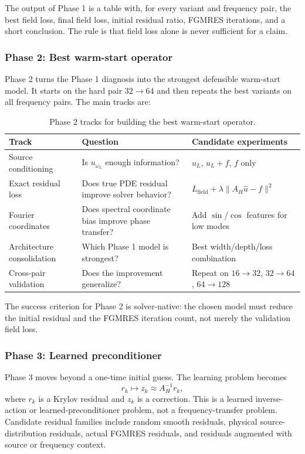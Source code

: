 The output of Phase 1 is a table with, for every variant and frequency pair,
the best field loss, final field loss, initial residual ratio, FGMRES
iterations, and a short conclusion. The rule is that field loss alone is never
sufficient for a claim.

\subsubsection{Phase 2: Best warm-start operator}

Phase 2 turns the Phase 1 diagnosis into the strongest defensible warm-start
model. It starts on the hard pair $32\to64$ and then repeats the best variants
on all frequency pairs. The main tracks are:
\begin{table}[h]
\centering
\begin{tabular}{lll}
\toprule
Track & Question & Candidate experiments \\
\midrule
Source conditioning &
Is $u_{\omega_L}$ enough information? &
$u_L$, $u_L+f$, $f$ only \\
Exact residual loss &
Does true PDE residual improve solver behavior? &
$L_{\mathrm{field}} + \lambda\|A_H \hat u - f\|^2$ \\
Fourier coordinates &
Does spectral coordinate bias improve phase transfer? &
Add $\sin$/$\cos$ features for low modes \\
Architecture consolidation &
Which Phase 1 model is strongest? &
Best width/depth/loss combination \\
Cross-pair validation &
Does the improvement generalize? &
Repeat on $16\to32$, $32\to64$, $64\to128$ \\
\bottomrule
\end{tabular}
\caption{Phase 2 tracks for building the best warm-start operator.}
\label{tab:twod_phase2_tracks}
\end{table}

The success criterion for Phase 2 is solver-native: the chosen model must
reduce the initial residual and the FGMRES iteration count, not merely the
validation field loss.

\subsubsection{Phase 3: Learned preconditioner}

Phase 3 moves beyond a one-time initial guess. The learning problem becomes
\begin{equation}
    r_k \mapsto z_k \approx A_H^{-1} r_k,
    \label{eq:twod_learned_preconditioner}
\end{equation}
where $r_k$ is a Krylov residual and $z_k$ is a correction. This is a learned
inverse-action or learned-preconditioner problem, not a frequency-transfer
problem. Candidate residual families include random smooth residuals,
physical source-distribution residuals, actual FGMRES residuals, and residuals
augmented with source or frequency context.

